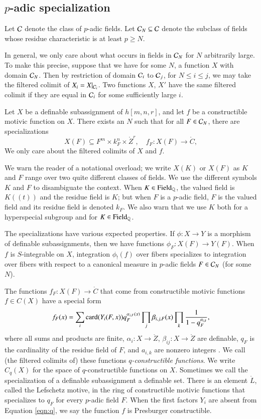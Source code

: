 \subsection{$p$-adic specialization}

Let $\mathcal C$ denote the class of $p$-adic fields.
Let $\mathcal C_N\subseteq \mathcal C$ denote the subclass of fields whose residue characteristic is at least $p\ge N$.

In general, we only care about what occurs in fields in $\mathcal C_N$ for $N$ arbitrarily large.
To make this precise, suppose that we have for some $N$, a function $X$ with domain $\mathcal C_N$.
Then by restriction of domain $\mathcal C_i$ to $\mathcal C_{j}$, for $N\le i\le j$, we may take the filtered colimit of $X_i=X|_{\mathcal C_i}$.
Two functions $X$, $X'$ have the same filtered colimit if they are equal in $\mathcal C_i$ for some sufficiently large $i$.

Let $X$ be a definable subassignment of $h[m,n,r]$, and let $f$ be a constructible motivic function on $X$.   There exists
an $N$ such that for all $F\in \mathcal C_N$, there are specializations
\[
X(F)\subseteq F^m\times k_F^n\times \ring{Z}^r,  \quad f_F: X(F) \to\ring{C},
\]
We only care about the  filtered colimits of $X$ and $f$.

We warn the reader of a notational overload; we write $X(K)$ or $X(F)$ as $K$ and $F$ range over two quite different
classes of fields.  We use the different symbols $K$ and $F$  to disambiguate the context.
When $K\in {\operatorname{Field}}_{\mathbb{Q}}$, the valued field is $K((t))$ and the residue field is $K$; but when $F$ is a $p$-adic field, $F$
is the valued field and its residue field is denoted $k_F$.  We also warn that
we use $K$ both for a hyperspecial subgroup and for $K\in{\operatorname{Field}}_{\mathbb{Q}}$.

The specializations have various expected properties.
If $\phi:X\to Y$ is a morphism of definable subassignments, then we have functions $\phi_F:X(F)\to Y(F)$.
When $f$ is $S$-integrable on $X$,  integration $\phi_!(f)$ over fibers  specializes to integration over fibers 
with respect to a canonical measure in
 $p$-adic fields $F\in \mathcal C_N$ (for some $N$).


The functions $f_F:X(F)\to\ring{C}$ that come from constructible motivic functions  $f\in C(X)$ have a special form
\begin{equation}\label{eqn:q}
f_F(x) = \sum_i {\operatorname{card}}(Y_i(F,x)) q_F^{\alpha_{i,F}(x)} \prod_j \beta_{i,j,F}(x)\prod_k \frac{1}{1-q_F^{a_{i,k}}},
\end{equation}
where all sums and products are finite, $\alpha_{i}:X\to\ring{Z}$, $\beta_{ij}:X\to\ring{Z}$ are definable, $q_F$
is the  cardinality of the residue field of $F$, and $a_{i,k}$ are nonzero integers \cite[\S2]{cluckers2011btransfer}.
We call (the filtered colimits of) these functions  {\it $q$-constructible functions}.  We write $C_q(X)$ for the space of
$q$-constructible functions on $X$.
Sometimes we call the specialization of a  definable subassignment a definable set.  
There is an element $\ring{L}$, called the Lefschetz motive, in the ring of constructible motivic functions that specializes to $q_F$
for every $p$-adic field $F$.  When the first factors $Y_i$ are absent from Equation \ref{eqn:q}, we say the function $f$
is Presburger constructible.

